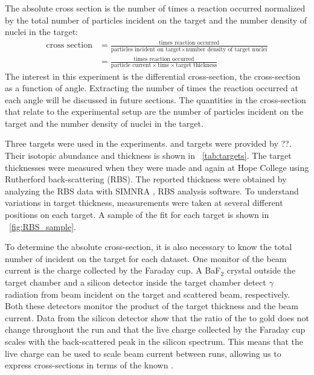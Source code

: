 The absolute cross section is the number of times a reaction occurred normalized by the total number of particles incident on the target and the number density of nuclei in the target:
\begin{align}
\text{cross section} &= \frac{\text{times reaction occurred}}{\text{particles incident on target} \times \text{number density of target nuclei}} \\
                     &= \frac{\text{times reaction occurred}}{\text{particle current} \times \text{time} \times \text{target thickness}}
\label{eq:cross_section}
\end{align}
The interest in this experiment is the differential cross-section, the cross-section as a function of angle.  Extracting the number of times the reaction occurred at each angle will be discussed in future sections.  The quantities in the cross-section that relate to the experimental setup are the number of particles incident on the target and the number density of nuclei in the target.

Three targets were used in the experiments.  \GeTargets and  targets were provided by ??.  Their isotopic abundance and thickness is shown in {\tab}~\ref{tab:targets}.  The target thicknesses were measured when they were made and again at Hope College using Rutherford back-scattering (RBS).  The reported thickness were obtained by analyzing the RBS data with SIMNRA \cite{SIMNRA}, RBS analysis software.  To understand variations in target thickness, measurements were taken at several different positions on each target.  A sample of the fit for each target is shown in {\fig}~\ref{fig:RBS_sample}.

To determine the absolute cross-section, it is also necessary to know the total number of  incident on the target for each dataset.  One monitor of the beam current is the charge collected by the Faraday cup.  A BaF$_2$ crystal outside the target chamber and a silicon detector inside the target chamber detect $\gamma$ radiation from beam incident on the target and scattered  beam, respectively.  Both these detectors monitor the product of the target thickness and the beam current.  Data from the silicon detector show that the ratio of the \GeTargets to gold does not change throughout the run and that the live charge collected by the Faraday cup scales with the back-scattered peak in the silicon spectrum.  This means that the live charge can be used to scale beam current between runs, allowing us to express \reaction cross-sections in terms of the known \MgReaction.


